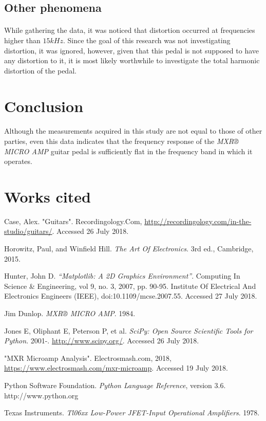 \documentclass[a4paper, 12pt]{article}
\begin{document}
\subsection{Other phenomena}
\paragraph*{}
While gathering the data, it was noticed that distortion occurred at 
frequencies higher than $15\si{kHz}$. Since the goal of this research was not 
investigating distortion, it was ignored, however, given that this pedal is 
not supposed to have any distortion to it, it is most likely worthwhile to 
investigate the total harmonic distortion of the pedal.

\section{Conclusion}
\paragraph*{}
Although the measurements acquired in this study are not equal to those 
of other parties, even this data indicates that the frequency response of 
the \textit{MXR® MICRO AMP} guitar pedal is sufficiently flat in the frequency 
band in which it operates.

\newpage
\section*{Works cited}
\begin{hangparas}{.25in}{1}
	Case, Alex. "Guitars". Recordingology.Com, 
	\url{http://recordingology.com/in-the-studio/guitars/}. 
	Accessed 26 July 2018.


	Horowitz, Paul, and Winfield Hill. \textit{The Art Of Electronics}. 3rd ed., 
	Cambridge, 2015.


	Hunter, John D. \textit{``Matplotlib: A 2D Graphics Environment''}. 
	Computing In Science \& Engineering, vol 9, no. 3, 2007, pp. 90-95. 
	Institute Of Electrical And Electronics Engineers (IEEE), 
	doi:10.1109/mcse.2007.55. Accessed 27 July 2018.

	
	Jim Dunlop. \textit{MXR® MICRO AMP}. 1984.


	Jones E, Oliphant E, Peterson P, et al. \textit{SciPy: Open Source 
	Scientific Tools for Python}. 2001-. \url{http://www.scipy.org/}. 
	Accessed 26 July 2018.


	"MXR Microamp Analysis". Electrosmash.com, 2018, 
	\url{https://www.electrosmash.com/mxr-microamp}. Accessed 19 July 2018.


	Python Software Foundation. \textit{Python Language Reference}, version 
	3.6. http://www.python.org


	Texas Instruments. \textit{Tl06xx Low-Power JFET-Input Operational 
	Amplifiers}. 1978.


\end{hangparas}
\end{document}
